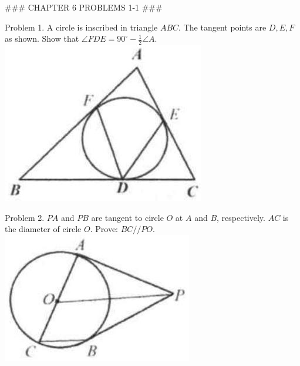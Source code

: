 \documentclass[10pt]{article}
\begin{document}
### CHAPTER 6 PROBLEMS 1-1 ###

Problem 1. A circle is inscribed in triangle \(A B C\). The tangent points are \(D, E, F\) as shown. Show that \(\angle F D E=90^{\circ}-\frac{1}{2} \angle A\).\\
\includegraphics[max width=\textwidth, center]{2025_04_17_97bc1f7e44d93c271a88g-154(1)}

Problem 2. \(P A\) and \(P B\) are tangent to circle \(O\) at \(A\) and \(B\), respectively. \(A C\) is the diameter of circle \(O\). Prove: \(B C / / P O\).\\
\includegraphics[max width=\textwidth, center]{2025_04_17_97bc1f7e44d93c271a88g-154(2)}
\end{document}
